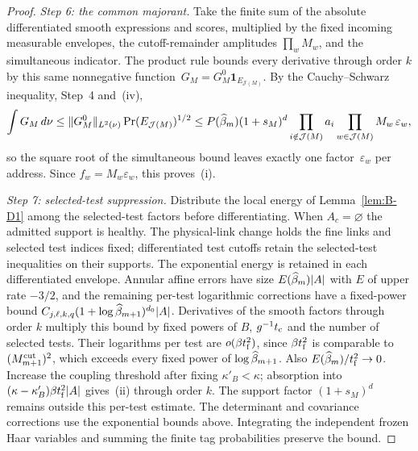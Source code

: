 \begin{proof}
\emph{Step 6: the common majorant.} Take the finite sum of the absolute differentiated smooth expressions and scores, multiplied by the fixed incoming measurable envelopes, the cutoff-remainder amplitudes $\prod_wM_w$, and the simultaneous indicator. The product rule bounds every derivative through order $k$ by this same nonnegative function~$G_M=G_M^0\mathbf 1_{E_{\mathcal J(M)}}$. By the Cauchy--Schwarz inequality, Step~4 and~(iv),
\begin{equation*}
\int G_M\,d\nu\le\|G_M^0\|_{L^2(\nu)}\Pr(E_{\mathcal J(M)})^{1/2}
\le P(\widehat{\beta}_m)(1+s_M)^d\prod_{i\notin\mathcal J(M)}a_i\prod_{w\in\mathcal J(M)}M_w\,\varepsilon_w,
\end{equation*}
so the square root of the simultaneous bound leaves exactly one factor~$\varepsilon_w$ per address. Since $f_w=M_w\varepsilon_w$, this proves~(i).

\emph{Step 7: selected-test suppression.} Distribute the local energy of Lemma~\ref{lem:B-D1} among the selected-test factors before differentiating. When $A_c=\varnothing$ the admitted support is healthy. The physical-link change holds the fine links and selected test indices fixed; differentiated test cutoffs retain the selected-test inequalities on their supports. The exponential energy is retained in each differentiated envelope. Annular affine errors have size $E(\widehat{\beta}_m)|A|$ with $E$ of upper rate $-3/2$, and the remaining per-test logarithmic corrections have a fixed-power bound $C_{j,\ell,k,q}(1+\log\widehat{\beta}_{m+1})^{d_0}|A|$. Derivatives of the smooth factors through order $k$ multiply this bound by fixed powers of $B$, $g^{-1}t_{\rm c}$ and the number of selected tests. Their logarithms per test are $o(\beta t_{\rm f}^2)$, since $\beta t_{\rm f}^2$ is comparable to $(M^{\mathrm{cut}}_{m+1})^2$, which exceeds every fixed power of $\log\widehat{\beta}_{m+1}$. Also $E(\widehat{\beta}_m)/t_{\rm f}^2\to0$. Increase the coupling threshold after fixing $\kappa'_B<\kappa$; absorption into $(\kappa-\kappa'_B)\beta t_{\rm f}^2|A|$ gives~(ii) through order $k$. The support factor $(1+s_M)^d$ remains outside this per-test estimate. The determinant and covariance corrections use the exponential bounds above. Integrating the independent frozen Haar variables and summing the finite tag probabilities preserve the bound.


\end{proof}
